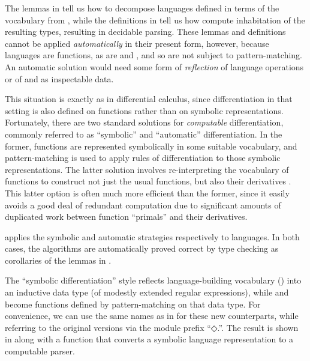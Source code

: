 \documentclass[acmsmall,screen,anonymous,timestamp]{acmart}
\begin{document}


The lemmas in  tell us how to decompose languages defined in terms of the vocabulary from , while the definitions in  tell us how compute inhabitation of the resulting types, resulting in decidable parsing.
These lemmas and definitions cannot be applied \emph{automatically} in their present form, however, because languages are functions, as are  and , and so are not subject to pattern-matching.
An automatic solution would need some form of \emph{reflection} of language operations or of  and  as inspectable data.

This situation is exactly as in differential calculus, since differentiation in that setting is also defined on functions rather than on symbolic representations.
Fortunately, there are two standard solutions for \emph{computable} differentiation, commonly referred to as ``symbolic'' and ``automatic'' differentiation.
In the former, functions are represented symbolically in some suitable vocabulary, and pattern-matching is used to apply rules of differentiation to those symbolic representations.
The latter solution involves re-interpreting the vocabulary of functions to construct not just the usual functions, but also their derivatives \citep{Griewank89onAD, GriewankWalther2008EvalDerivs, Elliott-2018-ad-icfp}.
This latter option is often much more efficient than the former, since it easily avoids a good deal of redundant computation due to significant amounts of duplicated work between function ``primals'' and their derivatives.

 applies the symbolic and automatic strategies respectively to languages.
In both cases, the algorithms are automatically proved correct by type checking as corollaries of the lemmas in .

\rnc{}

\nc{}

The ``symbolic differentiation'' style reflects language-building vocabulary () into an inductive data type (of modestly extended regular expressions), while  and  become functions defined by pattern-matching on that data type.
For convenience, we can use the same names as in  for these new counterparts, while referring to the original versions via the module prefix ``{◇.}\hspace{0.05em}''.
The result is shown in  along with a function {} that converts a symbolic language representation to a computable parser.
\end{document}

